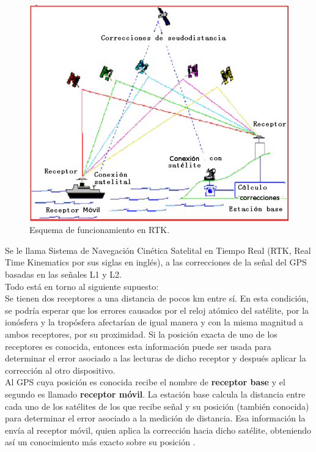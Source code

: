 \begin{figure}[ht]
\centering
\includegraphics[scale=0.30]{Figures/DGPS1}
\caption[Esquema de funcionamiento en RTK.]{Esquema de funcionamiento en RTK.}
\label{fig:RTK}
\end{figure}

Se le llama Sistema de Navegación Cinética Satelital en Tiempo Real (RTK, Real Time Kinematics por sus siglas en inglés), a las correcciones de la señal del GPS basadas en las señales L1 y L2. \\

Todo está en torno al siguiente supuesto: \\

Se tienen dos receptores a una distancia de pocos km entre sí. En esta condición, se podría esperar que los errores causados por el reloj atómico del satélite, por la ionósfera y la tropósfera afectarían de igual manera y con la misma magnitud a ambos receptores, por su proximidad. Si la posición exacta de uno de los receptores es conocida, entonces esta información puede ser usada para determinar el error asociado a las lecturas de dicho receptor y después aplicar la corrección al otro dispositivo. \\

Al GPS cuya posición es conocida recibe el nombre de \textbf{receptor base} y el segundo es llamado \textbf{receptor móvil}. La estación base calcula la distancia entre cada uno de los satélites de los que recibe señal y su posición (también conocida) para determinar el error asociado a la medición de distancia. Esa información la envía al receptor móvil, quien aplica la corrección hacia dicho satélite, obteniendo así un conocimiento más exacto sobre su posición \cite{fallas2002sistema}. \\

